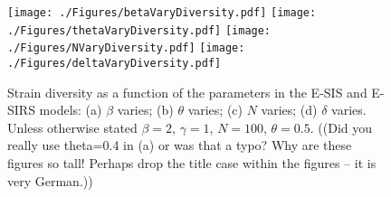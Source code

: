 \documentclass[smallextended]{svjour3}       %
\begin{document}
\begin{figure}
	\centering
 		\texttt{[image: ./Figures/betaVaryDiversity.pdf]}
  		\texttt{[image: ./Figures/thetaVaryDiversity.pdf]}
  		\texttt{[image: ./Figures/NVaryDiversity.pdf]}
  		\texttt{[image: ./Figures/deltaVaryDiversity.pdf]}
	\caption{Strain diversity as a function of the parameters in the E-SIS and E-SIRS models: (a) $\beta$ varies; (b) $\theta$ varies; (c) $N$ varies; (d) $\delta$ varies. Unless otherwise stated $\beta=2$, $\gamma=1$, $N=100$, $\theta=0.5$. ((Did you really use theta=0.4 in (a) or was that a typo? Why are these figures so tall! Perhaps drop the title case within the figures -- it is very German.))}
	\label{fig: div}
\end{figure}
\end{document}
